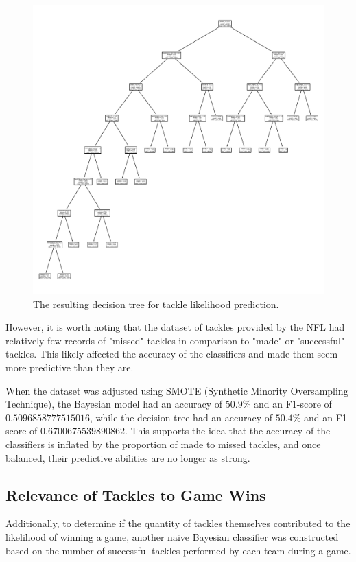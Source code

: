 \documentclass[bibtex, sigconf, hyperref={colorlinks=true,linkcolor=blue,urlcolor=blue}]{acmart}
\begin{document}
\begin{figure}[h]
  \centering
  \includegraphics[width=\linewidth]
  {decision_tree.png}
  \caption{The resulting decision tree for tackle likelihood prediction.}
\end{figure}

However, it is worth noting that the dataset of tackles provided by the NFL had relatively few records
of "missed" tackles in comparison to "made" or "successful" tackles. This likely affected the accuracy
of the classifiers and made them seem more predictive than they are.

When the dataset was adjusted using SMOTE (Synthetic Minority Oversampling Technique), the
Bayesian model had an accuracy of $50.9\%$ and an F1-score of $0.5096858777515016$, while the
decision tree had an accuracy of $50.4\%$ and an F1-score of $0.6700675539890862$. This supports
the idea that the accuracy of the classifiers is inflated by the proportion of made to missed tackles,
and once balanced, their predictive abilities are no longer as strong.

\subsection{Relevance of Tackles to Game Wins}

Additionally, to determine if the quantity of tackles themselves contributed to the likelihood
of winning a game, another naive Bayesian classifier was constructed based on the number of successful
tackles performed by each team during a game.
\end{document}
